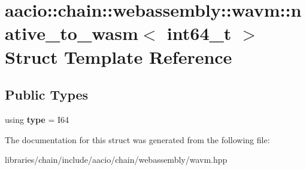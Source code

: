 \hypertarget{structaacio_1_1chain_1_1webassembly_1_1wavm_1_1native__to__wasm_3_01int64__t_01_4}{}\section{aacio\+:\+:chain\+:\+:webassembly\+:\+:wavm\+:\+:native\+\_\+to\+\_\+wasm$<$ int64\+\_\+t $>$ Struct Template Reference}
\label{structaacio_1_1chain_1_1webassembly_1_1wavm_1_1native__to__wasm_3_01int64__t_01_4}
\subsection*{Public Types}
\begin{DoxyCompactItemize}
\item 
\mbox{\label{structaacio_1_1chain_1_1webassembly_1_1wavm_1_1native__to__wasm_3_01int64__t_01_4_a29c080984fd1d7940f4142ad884b7033}} 
using {\bfseries type} = I64
\end{DoxyCompactItemize}


The documentation for this struct was generated from the following file\+:\begin{DoxyCompactItemize}
\item 
libraries/chain/include/aacio/chain/webassembly/wavm.\+hpp\end{DoxyCompactItemize}
